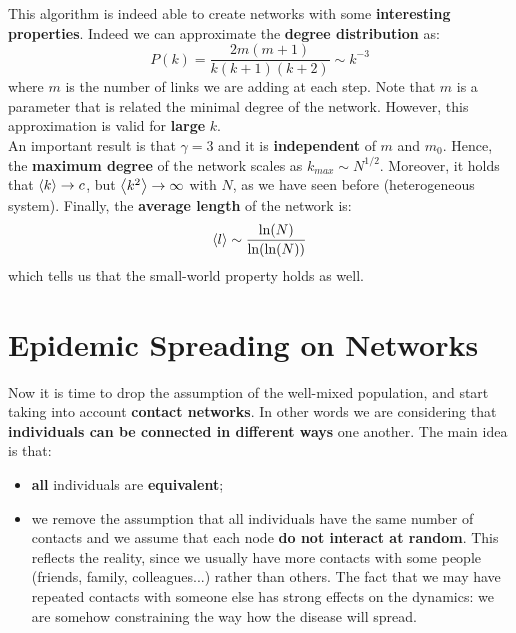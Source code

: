 \documentclass[../main/main.tex]{subfiles}
\begin{document}
This algorithm is indeed able to create networks with some \textbf{interesting properties}. Indeed we can approximate the \textbf{degree distribution} as:
\begin{equation*}
  P(k) = \frac{2 m (m +1)}{k(k+1)(k+2)} \sim k^{-3}
\end{equation*}
where $m$ is the number of links we are adding at each step. Note that $m$ is a parameter that is related the minimal degree of the network. However, this approximation is valid for \textbf{large} \( k \).\\
An important result is that \( \gamma =3  \) and it is \textbf{independent} of \( m \) and \( m_0 \).
Hence, the \textbf{maximum degree} of the network scales as \( k_{max} \sim N^{1/2} \). Moreover, it holds that \( \expval{k} \rightarrow c \), but \( \expval{k^2} \rightarrow \infty   \) with \( N \), as we have seen before (heterogeneous system).
Finally, the \textbf{average length} of the network is:
\begin{equation*}
  \expval{l} \sim \frac{\ln (N)}{\ln (\ln (N))}
\end{equation*}
which tells us that the small-world property holds as well.










\chapter{Epidemic Spreading on Networks}

Now it is time to drop the assumption of the well-mixed population, and start taking into account \textbf{contact networks}. In other words we are considering that \textbf{individuals can be connected in different ways} one another.
The main idea is that:
\begin{itemize}
\item \textbf{all} individuals are \textbf{equivalent};
\item we remove the assumption that all individuals have the same number of contacts and we assume that each node \textbf{do not interact at random}. This reflects the reality, since we usually have more contacts with some people (friends, family, colleagues...) rather than others. The fact that we may have repeated contacts with someone else has strong effects on the dynamics: we are somehow constraining the way how the disease will spread.
\end{itemize}
\end{document}
